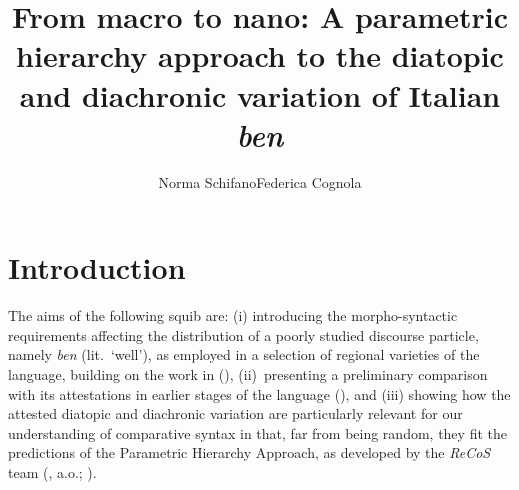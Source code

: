 \documentclass[output=paper]{langsci/langscibook}
\author{Norma Schifano\affiliation{University of Birmingham}\lastand Federica
Cognola\affiliation{La Sapienza University, Rome}}
\title{From macro to nano: A parametric hierarchy approach to the diatopic and
diachronic variation of Italian \textit{ben}}
\begin{document}
\glsresetall


\section{Introduction}

The aims of the following squib are: (i) introducing the morpho-syntactic
requirements affecting the distribution of a poorly studied discourse particle,
namely  \emph{ben} (lit.\ ‘well’), as employed in a selection of
regional varieties of the language, building on the work in
\textcite{CognSchi2015,CognSchi2018b,CognSchi2018} (),
(ii)~presenting a preliminary comparison with its attestations in earlier
stages of the language (), and (iii) showing how the
attested diatopic and diachronic variation are particularly relevant for our
understanding of comparative syntax in that, far from being random, they fit
the predictions of the Parametric Hierarchy Approach, as developed by the
\emph{ReCoS} team
(\citealt{Roberts2012,BibRob2012,BibRob2015,BibRob2016,BibHolRobShee2014,BibRobShee2014},
a.o.; ).
\end{document}
